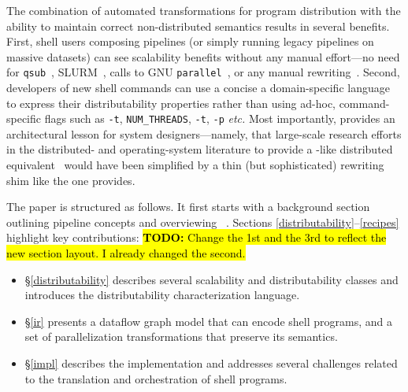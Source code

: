 \documentclass[sigplan,10pt,review,anonymous]{acmart}
\newcommand{\etc}{{\em etc.}\xspace}
\newcommand{\ttt}[1]{\texttt{\small #1}}
\newcommand{\TODO}[1]{\hl{\textbf{TODO:} #1}\xspace}
\begin{document}
The combination of automated transformations for program distribution with the ability to maintain correct non-distributed semantics results in several benefits.
First, shell users composing pipelines (or simply running legacy pipelines on massive datasets) can see scalability benefits without any manual effort---no need for \ttt{qsub}~\cite{gentzsch2001sun}, \textsc{SLURM}~\cite{yoo2003slurm}, calls to \textsc{GNU} \ttt{parallel}~\cite{Tange2011a}, or any manual rewriting~\cite{mapreduce:08, ciel:11, spark:12}.
Second, developers of new shell commands can use a concise a domain-specific language to express their distributability properties rather than using ad-hoc, command-specific flags such as {\tt -t},  {\tt NUM\_THREADS}, \ttt{-t}, \ttt{-p} \etc
Most importantly, \sys provides an architectural lesson for system designers---namely, that large-scale research efforts in the distributed- and operating-system literature to provide a \unix-like distributed equivalent~\cite{ousterhout1988sprite, mullender1990amoeba, pike1990plan9, barak1998mosix} would have been simplified by a thin (but sophisticated) rewriting shim like the one \sys provides.


The paper is structured as follows.  It first starts with a background
section outlining pipeline concepts and overviewing \sys~.
Sections \ref{distributability}--\ref{recipes} highlight key
contributions: \TODO{Change the 1st and the 3rd to reflect the new
  section layout. I already changed the second.}
\begin{itemize}

  \item
  \S\ref{distributability} describes several scalability and distributability classes and introduces the distributability characterization language.

  \item
  \S\ref{ir} presents a dataflow graph model that can encode shell programs, and a set of parallelization transformations that preserve its semantics.

  \item
    \S\ref{impl} describes the \sys implementation and addresses several challenges related to the translation and orchestration of shell programs.
\end{itemize}
\end{document}
